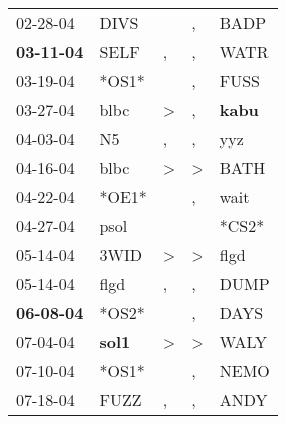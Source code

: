 \begin{supertabular}{p{0.07\textwidth}p{0.06\textwidth}p{0.02\textwidth}p{0.02\textwidth}p{0.06\textwidth}}
          02-28-04\textsuperscript{} &           DIVS\textsuperscript{} &                  &                , &           BADP\textsuperscript{} \\
 \textbf{03-11-04\textsuperscript{}} &           SELF\textsuperscript{} &                , &                , &           WATR\textsuperscript{} \\
          03-19-04\textsuperscript{} &                            *OS1* &                  &                , &           FUSS\textsuperscript{} \\
          03-27-04\textsuperscript{} &           blbc\textsuperscript{} &     \textgreater &                , &  \textbf{kabu\textsuperscript{}} \\
          04-03-04\textsuperscript{} &             N5\textsuperscript{} &                , &                , &            yyz\textsuperscript{} \\
          04-16-04\textsuperscript{} &           blbc\textsuperscript{} &     \textgreater &     \textgreater &           BATH\textsuperscript{} \\
          04-22-04\textsuperscript{} &                            *OE1* &                  &                , &           wait\textsuperscript{} \\
          04-27-04\textsuperscript{} &           psol\textsuperscript{} &                  &                  &                            *CS2* \\
          05-14-04\textsuperscript{} &           3WID\textsuperscript{} &     \textgreater &     \textgreater &           flgd\textsuperscript{} \\
          05-14-04\textsuperscript{} &           flgd\textsuperscript{} &                , &                , &           DUMP\textsuperscript{} \\
 \textbf{06-08-04\textsuperscript{}} &                            *OS2* &                  &                , &           DAYS\textsuperscript{} \\
          07-04-04\textsuperscript{} &  \textbf{sol1\textsuperscript{}} &     \textgreater &     \textgreater &           WALY\textsuperscript{} \\
          07-10-04\textsuperscript{} &                            *OS1* &                  &                , &           NEMO\textsuperscript{} \\
          07-18-04\textsuperscript{} &           FUZZ\textsuperscript{} &                , &                , &           ANDY\textsuperscript{} \\

\end{supertabular}
